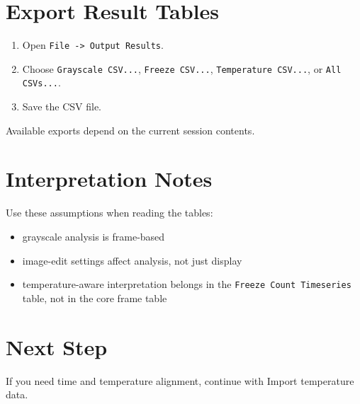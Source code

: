 \documentclass[
  9pt,
  letterpaper,
  oneside,
  open=any,
  DIV=15,
  parskip=half-,
  headings=big,
  numbers=noenddot
]{scrbook}
\begin{document}
\section{Export Result Tables}

\begin{enumerate}[leftmargin=*,itemsep=0.35em,topsep=0.4em]
\item Open \texttt{File -> Output Results}.
\item Choose \texttt{Grayscale CSV...}, \texttt{Freeze CSV...}, \texttt{Temperature CSV...}, or \texttt{All CSVs...}.
\item Save the CSV file.
\end{enumerate}

Available exports depend on the current session contents.


\section{Interpretation Notes}

Use these assumptions when reading the tables:


\begin{itemize}[leftmargin=*,itemsep=0.35em,topsep=0.4em]
\item grayscale analysis is frame-based
\item image-edit settings affect analysis, not just display
\item temperature-aware interpretation belongs in the \texttt{Freeze Count Timeseries} table, not in the core frame table
\end{itemize}

\section{Next Step}

If you need time and temperature alignment, continue with Import temperature data.
\end{document}
